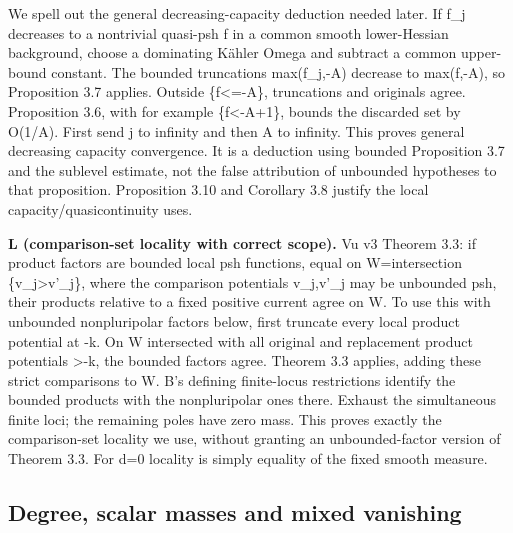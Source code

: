 \documentclass[
]{article}
\begin{document}
We spell out the general decreasing-capacity deduction needed later. If
f\_j decreases to a nontrivial quasi-psh f in a common smooth
lower-Hessian background, choose a dominating Kähler Omega and subtract
a common upper-bound constant. The bounded truncations max(f\_j,-A)
decrease to max(f,-A), so Proposition 3.7 applies. Outside
\{f\textless=-A\}, truncations and originals agree. Proposition 3.6,
with for example \{f\textless-A+1\}, bounds the discarded set by O(1/A).
First send j to infinity and then A to infinity. This proves general
decreasing capacity convergence. It is a deduction using bounded
Proposition 3.7 and the sublevel estimate, not the false attribution of
unbounded hypotheses to that proposition. Proposition 3.10 and Corollary
3.8 justify the local capacity/quasicontinuity uses.

\textbf{L (comparison-set locality with correct scope).} Vu v3 Theorem
3.3: if product factors are bounded local psh functions, equal on
W=intersection \{v\_j\textgreater v'\_j\}, where the comparison
potentials v\_j,v'\_j may be unbounded psh, their products relative to a
fixed positive current agree on W. To use this with unbounded
nonpluripolar factors below, first truncate every local product
potential at -k. On W intersected with all original and replacement
product potentials \textgreater-k, the bounded factors agree. Theorem
3.3 applies, adding these strict comparisons to W. B's defining
finite-locus restrictions identify the bounded products with the
nonpluripolar ones there. Exhaust the simultaneous finite loci; the
remaining poles have zero mass. This proves exactly the comparison-set
locality we use, without granting an unbounded-factor version of Theorem
3.3. For d=0 locality is simply equality of the fixed smooth measure.

\subsection{Degree, scalar masses and mixed
vanishing}\label{degree-scalar-masses-and-mixed-vanishing}
\end{document}

